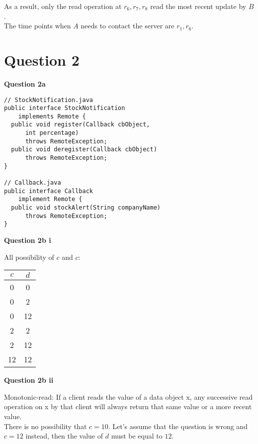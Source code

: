 \documentclass[11pt,a4paper]{report}
\begin{document}
\begin{multicols*}{2}
\noindent As a result, only the read operation at $r_6,r_7,r_8$ read the most recent update by $B$. \\

\noindent The time points when $A$ needs to contact the server are $r_1,r_6$.\\

\section{Question 2}

\noindent \textbf{Question 2a}

\begin{verbatim}
// StockNotification.java
public interface StockNotification 
    implements Remote {
  public void register(Callback cbObject, 
      int percentage) 
      throws RemoteException;
  public void deregister(Callback cbObject) 
      throws RemoteException;
}

// Callback.java
public interface Callback 
    implement Remote {
  public void stockAlert(String companyName) 
      throws RemoteException;
}
\end{verbatim}

\noindent \textbf{Question 2b i}

\noindent All possibility of $c$ and $c$:

\begin{center}
\begin{tabular}{|c|c|}
  \hline
  $c$ & $d$ \\
  \hline
  0  & 0  \\
  0  & 2  \\
  0  & 12 \\
  2  & 2  \\
  2  & 12 \\
  12 & 12 \\ \hline
\end{tabular}
\end{center}

\noindent \textbf{Question 2b ii}

\noindent Monotonic-read: If a client reads the value of a data object x, any successive read operation on x by that client will always return that same value or a more recent value.\\

\noindent There is no possibility that $c=10$. Let's assume that the question is wrong and $c=12$ instead, then the value of $d$ must be equal to $12$.\\


\end{multicols*}
\end{document}
